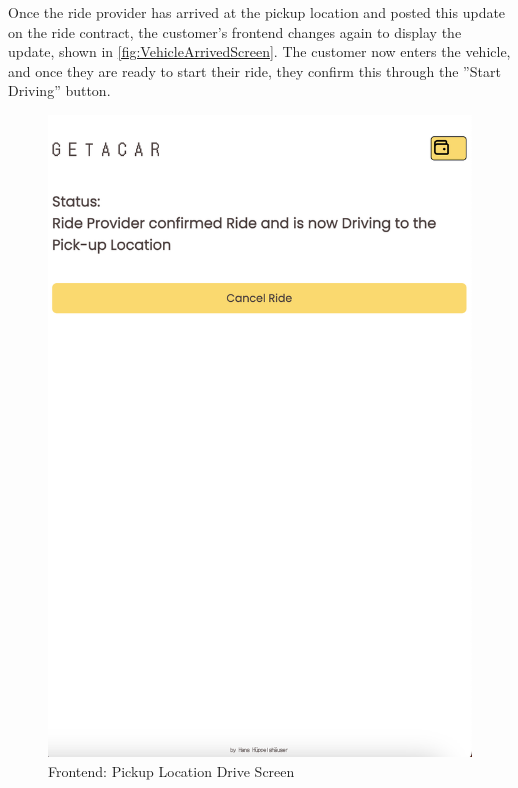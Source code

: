 Once the ride provider has arrived at the pickup location and posted this update on the ride contract, the customer's frontend changes again to display the update, shown in \ref{fig:VehicleArrivedScreen}. The customer now enters the vehicle, and once they are ready to start their ride, they confirm this through the ''Start Driving'' button.


\begin{figure}[H]
    \centering
    
    \begin{minipage}{0.45\linewidth}
        \centering
        \includegraphics[width=\linewidth]{data/ffss/7.png}
        \caption{Frontend: Pickup Location Drive Screen}
        \label{fig:PickupLocationDriveScreen}
    \end{minipage}

\end{figure}
